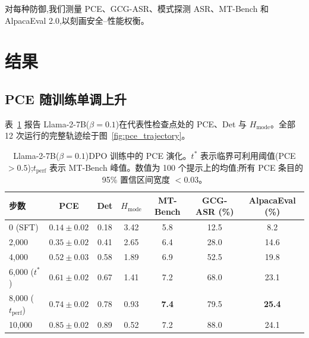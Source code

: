\noindent 对每种防御,我们测量 PCE、GCG-ASR、模式探测 ASR、MT-Bench 和 AlpacaEval 2.0,以刻画安全--性能权衡。

\section{结果}
\label{sec:results}

\subsection{PCE 随训练单调上升}
\label{sec:res_evolution}

表~\ref{tab:pce_evolution} 报告 Llama-2-7B($\beta = 0.1$)在代表性检查点处的 PCE、Det 与 $H_{\text{mode}}$。全部 12 次运行的完整轨迹绘于图~\ref{fig:pce_trajectory}。

\begin{table}[t]
\centering
\caption{Llama-2-7B($\beta = 0.1$)DPO 训练中的 PCE 演化。$t^*$ 表示临界可利用阈值(PCE $> 0.5$);$t_{\text{perf}}$ 表示 MT-Bench 峰值。数值为 100 个提示上的均值;所有 PCE 条目的 95\% 置信区间宽度 $< 0.03$。}
\label{tab:pce_evolution}
\small
\begin{tabular}{@{}lcccccc@{}}
\toprule
步数 & PCE & Det & $H_{\text{mode}}$ & MT-Bench & GCG-ASR (\%) & AlpacaEval (\%) \\
\midrule
0 (SFT) & $0.14 \pm 0.02$ & 0.18 & 3.42 & 5.8 & 12.5 & 8.2 \\
2{,}000   & $0.35 \pm 0.02$ & 0.41 & 2.65 & 6.4 & 28.0 & 14.6 \\
4{,}000   & $0.52 \pm 0.03$ & 0.58 & 1.89 & 6.9 & 52.5 & 19.8 \\
6{,}000 ($t^*$) & $0.61 \pm 0.02$ & 0.67 & 1.41 & 7.2 & 68.0 & 23.1 \\
8{,}000 ($t_{\text{perf}}$) & $0.74 \pm 0.02$ & 0.78 & 0.93 & \textbf{7.4} & 79.5 & \textbf{25.4} \\
10{,}000 & $0.85 \pm 0.02$ & 0.89 & 0.52 & 7.2 & 88.0 & 24.1 \\
\bottomrule
\end{tabular}
\end{table}

